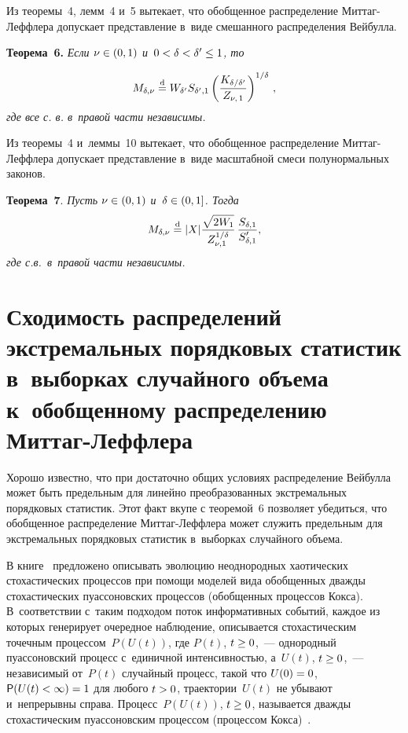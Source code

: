 \begin{multicols}{2}
\smallskip

Из теоремы~4, лемм~4 и~5 вытекает, что обобщенное распределение
Мит\-таг-Леф\-фле\-ра допускает представление в~виде смешанного
распределения Вейбулла.

\smallskip

\noindent
\textbf{Теорема~6.} \textit{Если $\nu\hm\in(0,1)$ и~$0\hm<\delta\hm<\delta'\hm\le1$,
то}

\noindent
$$
M_{\delta,\nu}\stackrel{\mathrm{d}}{=} W_{\delta'}
S_{\delta',1}\left(\displaystyle\frac{\displaystyle K_{\delta/\delta'}\mathstrut}{\displaystyle Z_{\nu,\,1}\mathstrut}\right)^{1/\delta}\,,
$$
\textit{где все с. в. в~правой части независимы.}

\smallskip

Из теоремы~4 и~леммы~10 вытекает, что обобщенное распределение
Мит\-таг-Леф\-фле\-ра допускает представление в~виде масштабной смеси
полунормальных законов.

\smallskip

\noindent
\textbf{Теорема~7}. \textit{Пусть $\nu\hm\in(0,1)$ и~$\delta\hm\in(0,1]$. Тогда}
$$
M_{\delta,\nu}\stackrel{\mathrm{d}}{=} |X|
\displaystyle\frac{\displaystyle \sqrt{2W_1}\mathstrut}{\displaystyle Z_{\nu,1}^{1/\delta}\mathstrut}\,
\displaystyle\frac{\displaystyle S_{\delta,1}\mathstrut}{\displaystyle S'_{\delta,1}\mathstrut},
$$
\textit{где с.в.\ в~правой части независимы.}

\vspace*{-6pt}

\section{Сходимость распределений экстремальных порядковых статистик 
в~выборках случайного объема к~обобщенному распределению Миттаг-Леффлера}

Хорошо известно, что при достаточно общих условиях
распределение Вейбулла может быть предельным для линейно
преобразованных экстремальных порядковых статистик. Этот факт вкупе
с теоремой~6 позволяет убедиться, что обобщенное распределение
Мит\-таг-Леф\-фле\-ра может служить предельным для экстремальных
порядковых статистик в~выборках случайного объема.

В книге~\cite{GnedenkoKorolev1996} предложено описывать эволюцию
неоднородных хаотических стохастических процессов при помощи моделей
вида обобщенных дважды стохастических пуассоновских процессов
(обобщенных процессов Кокса). В~соответствии с~таким\linebreak
 подходом поток
информативных событий, каж\-дое из которых генерирует очередное
наблюдение, описывается стохастическим точечным процессом~$P(U(t))$,
где $P(t)$, $t\hm\geq0$,~--- однородный\linebreak
 пуассоновский процесс с~единичной
интенсивностью, а~$U(t)$, $t\hm\geq0$,~--- независимый от~$P(t)$
случайный процесс, такой что $U(0)\hm=0$, ${\sf P}(U(t)\hm<\infty)\hm=1$ для
любого $t\hm>0$, траектории~$U(t)$ не убывают и~непрерывны справа.
Процесс~$P(U(t))$, $t\hm\geq0$, называется дважды стохастическим
пуассоновским процессом (процессом Кокса)~\cite{Grandell1976}.


\end{multicols}
